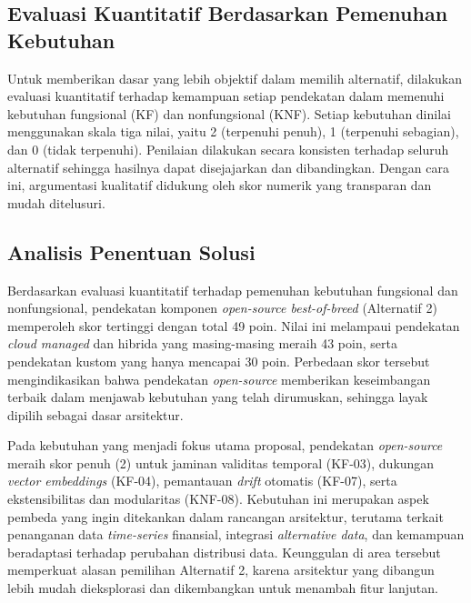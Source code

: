 \subsection{Evaluasi Kuantitatif Berdasarkan Pemenuhan Kebutuhan}

Untuk memberikan dasar yang lebih objektif dalam memilih alternatif, dilakukan evaluasi kuantitatif terhadap kemampuan setiap pendekatan dalam memenuhi kebutuhan fungsional (KF) dan nonfungsional (KNF). Setiap kebutuhan dinilai menggunakan skala tiga nilai, yaitu 2 (terpenuhi penuh), 1 (terpenuhi sebagian), dan 0 (tidak terpenuhi). Penilaian dilakukan secara konsisten terhadap seluruh alternatif sehingga hasilnya dapat disejajarkan dan dibandingkan. Dengan cara ini, argumentasi kualitatif didukung oleh skor numerik yang transparan dan mudah ditelusuri.



\vspace{-0.5cm}



\vspace{-0.5cm}

\subsection{Analisis Penentuan Solusi}

Berdasarkan evaluasi kuantitatif terhadap pemenuhan kebutuhan fungsional dan nonfungsional, pendekatan komponen \textit{open-source best-of-breed} (Alternatif 2) memperoleh skor tertinggi dengan total 49 poin. Nilai ini melampaui pendekatan \textit{cloud managed} dan hibrida yang masing-masing meraih 43 poin, serta pendekatan kustom yang hanya mencapai 30 poin. Perbedaan skor tersebut mengindikasikan bahwa pendekatan \textit{open-source} memberikan keseimbangan terbaik dalam menjawab kebutuhan yang telah dirumuskan, sehingga layak dipilih sebagai dasar arsitektur.

Pada kebutuhan yang menjadi fokus utama proposal, pendekatan \textit{open-source} meraih skor penuh (2) untuk jaminan validitas temporal (KF-03), dukungan \textit{vector embeddings} (KF-04), pemantauan \textit{drift} otomatis (KF-07), serta ekstensibilitas dan modularitas (KNF-08). Kebutuhan ini merupakan aspek pembeda yang ingin ditekankan dalam rancangan arsitektur, terutama terkait penanganan data \textit{time-series} finansial, integrasi \textit{alternative data}, dan kemampuan beradaptasi terhadap perubahan distribusi data. Keunggulan di area tersebut memperkuat alasan pemilihan Alternatif 2, karena arsitektur yang dibangun lebih mudah dieksplorasi dan dikembangkan untuk menambah fitur lanjutan.

